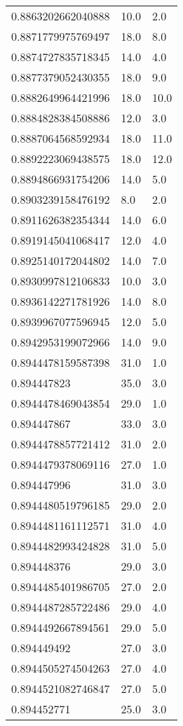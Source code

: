 \begin{center}
\begin{supertabular}[H]{p{0.30\textwidth}p{0.05\textwidth}p{0.05\textwidth}}
0.8863202662040888 & 10.0 & 2.0 \\ 
0.8871779975769497 & 18.0 & 8.0 \\ 
0.8874727835718345 & 14.0 & 4.0 \\ 
0.8877379052430355 & 18.0 & 9.0 \\ 
0.8882649964421996 & 18.0 & 10.0 \\ 
0.8884828384508886 & 12.0 & 3.0 \\ 
0.8887064568592934 & 18.0 & 11.0 \\ 
0.8892223069438575 & 18.0 & 12.0 \\ 
0.8894866931754206 & 14.0 & 5.0 \\ 
0.8903239158476192 & 8.0 & 2.0 \\ 
0.8911626382354344 & 14.0 & 6.0 \\ 
0.8919145041068417 & 12.0 & 4.0 \\ 
0.8925140172044802 & 14.0 & 7.0 \\ 
0.8930997812106833 & 10.0 & 3.0 \\ 
0.8936142271781926 & 14.0 & 8.0 \\ 
0.8939967077596945 & 12.0 & 5.0 \\ 
0.8942953199072966 & 14.0 & 9.0 \\ 
0.8944478159587398 & 31.0 & 1.0 \\ 
0.894447823 & 35.0 & 3.0 \\ 
0.8944478469043854 & 29.0 & 1.0 \\ 
0.894447867 & 33.0 & 3.0 \\ 
0.8944478857721412 & 31.0 & 2.0 \\ 
0.8944479378069116 & 27.0 & 1.0 \\ 
0.894447996 & 31.0 & 3.0 \\ 
0.8944480519796185 & 29.0 & 2.0 \\ 
0.8944481161112571 & 31.0 & 4.0 \\ 
0.8944482993424828 & 31.0 & 5.0 \\ 
0.894448376 & 29.0 & 3.0 \\ 
0.8944485401986705 & 27.0 & 2.0 \\ 
0.8944487285722486 & 29.0 & 4.0 \\ 
0.8944492667894561 & 29.0 & 5.0 \\ 
0.894449492 & 27.0 & 3.0 \\ 
0.8944505274504263 & 27.0 & 4.0 \\ 
0.8944521082746847 & 27.0 & 5.0 \\ 
0.894452771 & 25.0 & 3.0 \\ 

\end{supertabular}
\end{center}
